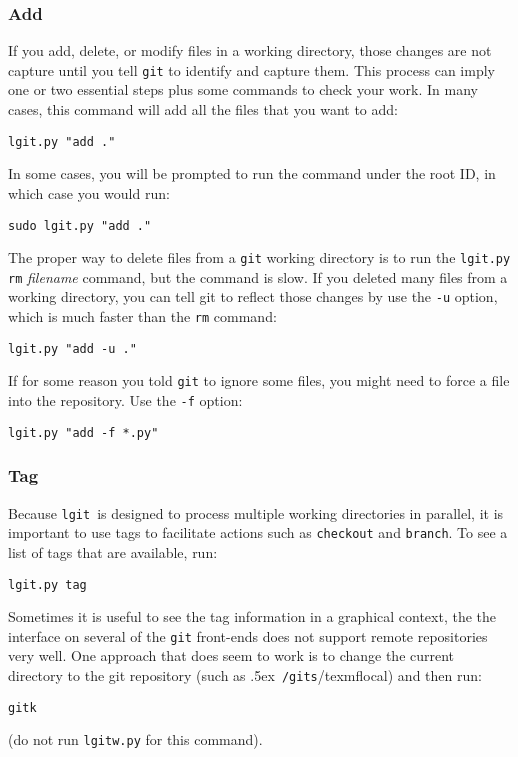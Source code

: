 \documentclass{ltxdoc}
\def\bobtilde{\lower.5ex\hbox{\tt \string~}}%
\def\ucmd#1{{\tt {#1}}}
\def\lgit{{\tt lgit}}
\def\mygits{\bobtilde\ucmd{/gits}}
\begin{document}
\subsubsection{Add}
If you add, delete, or modify files in a working directory, those changes are not capture until you tell \ucmd{git} to identify and capture them.  This process can imply one or two essential steps plus some commands to check your work. In many cases, this command will add all the files that you want to add:
\begin{verbatim}
lgit.py "add ."
\end{verbatim}
In some cases, you will be prompted to run the command under the root ID, in which case you would run:
\begin{verbatim}
sudo lgit.py "add ."
\end{verbatim}

The proper way to delete files from a \ucmd{git} working directory is to run the \ucmd{lgit.py rm} \emph{filename} command, but the command is slow.  If you deleted many files from a working directory, you can tell git to reflect those changes by use the \ucmd{-u} option, which is much faster than the \ucmd{rm} command:
\begin{verbatim}
lgit.py "add -u ."
\end{verbatim} 

If for some reason you told \ucmd{git} to ignore some files, you might need to force a file into the repository. Use the \ucmd{-f} option:
\begin{verbatim}
lgit.py "add -f *.py"
\end{verbatim}

\subsubsection{Tag}
Because \lgit\ is designed to process multiple working directories in parallel, it is important to use tags to facilitate actions such as \ucmd{checkout} and \ucmd{branch}.  To see a list of tags that are available, run:
\begin{verbatim}
lgit.py tag
\end{verbatim}

Sometimes it is useful to see the tag information in a graphical context, the the interface on several of the \ucmd{git} front-ends does not support remote repositories very well.  One approach that does seem to work is to change the current directory to the git repository (such as \mygits/texmflocal) and then run:
\begin{verbatim}
gitk
\end{verbatim}
(do not run \ucmd{lgitw.py} for this command).
\end{document}
